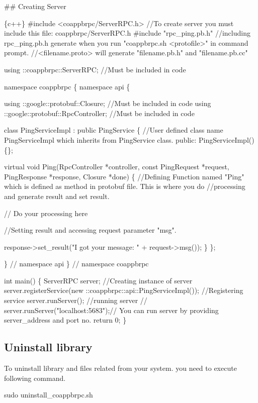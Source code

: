 \#\# Creating Server 
\begin{DoxyCode}
\{c++\}
#include <coappbrpc/ServerRPC.h> //To create server you must include this file: coappbrpc/ServerRPC.h
#include "rpc\_ping.pb.h" //including rpc\_ping.pb.h generate when you run "coappbrpc.sh <protofile>" in
       command prompt.
                        //<filename.proto> will generate "filename.pb.h" and "filename.pb.cc"

using ::coappbrpc::ServerRPC; //Must be included in code

namespace coappbrpc \{
namespace api \{

using ::google::protobuf::Closure; //Must be included in code
using ::google::protobuf::RpcController; //Must be included in code

class PingServiceImpl : public PingService \{ //User defined class name PingServiceImpl which inherits from
       PingService class.
public:
  PingServiceImpl()\{\};

  virtual void Ping(RpcController *controller, const PingRequest *request,
                    PingResponse *response, Closure *done) \{ 
    //Defining Function named "Ping" which is defined as method in protobuf file. This is where you do 
    //processing and generate result and set result. 

    // Do your processing here

    //Setting  result and accessing request parameter "msg".

    response->set\_result("I got your message: " + request->msg()); 
  \}
\};

\} // namespace api
\} // namespace coappbrpc

int main() \{
  ServerRPC server; //Creating instance of server
  server.registerService(new ::coappbrpc::api::PingServiceImpl()); //Registering service
  server.runServer(); //running server
  // server.runServer("localhost:5683");// You can run server by providing server\_address and port no.
  return 0;
\}
\end{DoxyCode}


\subsection*{Uninstall library}

To uninstall library and files related from your system. you need to execute following command. 
\begin{DoxyCode}
sudo uninstall\_coappbrpc.sh
\end{DoxyCode}


